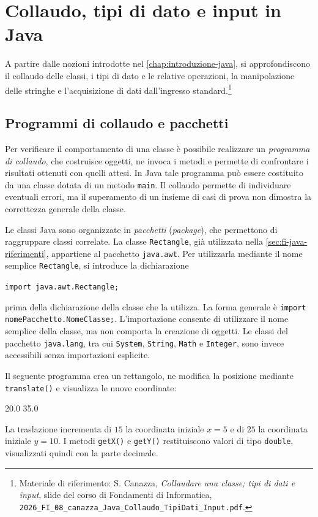 \chapter{Collaudo, tipi di dato e input in Java}
\label{chap:collaudo-tipi-input-java}

A partire dalle nozioni introdotte nel \cref{chap:introduzione-java},
si approfondiscono il collaudo delle classi, i tipi di dato e le
relative operazioni, la manipolazione delle stringhe e
l'acquisizione di dati dall'ingresso standard.\footnote{Materiale
di riferimento: S. Canazza, \emph{Collaudare una classe; tipi di
dati e input}, slide del corso di Fondamenti di Informatica,
\nolinkurl{2026_FI_08_canazza_Java_Collaudo_TipiDati_Input.pdf}.}

\section{Programmi di collaudo e pacchetti}
\label{sec:fi-java-collaudo}

Per verificare il comportamento di una classe è possibile
realizzare un \emph{programma di collaudo}, che costruisce
oggetti, ne invoca i metodi e permette di confrontare i risultati ottenuti
con quelli attesi. In Java tale programma può essere costituito
da una classe dotata di un metodo \texttt{main}. Il collaudo
permette di individuare eventuali errori, ma il superamento
di un insieme di casi di prova non dimostra la correttezza
generale della classe.

Le classi Java sono organizzate in \emph{pacchetti}
(\emph{package}), che permettono di raggruppare classi
correlate. La classe \texttt{Rectangle}, già utilizzata
nella \cref{sec:fi-java-riferimenti}, appartiene al pacchetto
\texttt{java.awt}. Per utilizzarla mediante il nome semplice
\texttt{Rectangle}, si introduce la dichiarazione
\begin{center}
  \texttt{import java.awt.Rectangle;}
\end{center}
prima della dichiarazione della classe che la utilizza.
La forma generale è
\texttt{import nomePacchetto.NomeClasse;}.
L'importazione consente di utilizzare il nome semplice
della classe, ma non comporta la creazione di oggetti.
Le classi del pacchetto \texttt{java.lang}, tra cui
\texttt{System}, \texttt{String}, \texttt{Math} e
\texttt{Integer}, sono invece accessibili senza
importazioni esplicite.

\begin{example}
Il seguente programma crea un rettangolo, ne modifica
la posizione mediante \texttt{translate()} e visualizza
le nuove coordinate:



\begin{unipdterminal}
20.0
35.0
\end{unipdterminal}

La traslazione incrementa di \(15\) la coordinata iniziale
\(x=5\) e di \(25\) la coordinata iniziale \(y=10\).
I metodi \texttt{getX()} e \texttt{getY()} restituiscono
valori di tipo \texttt{double}, visualizzati quindi
con la parte decimale.
\end{example}

